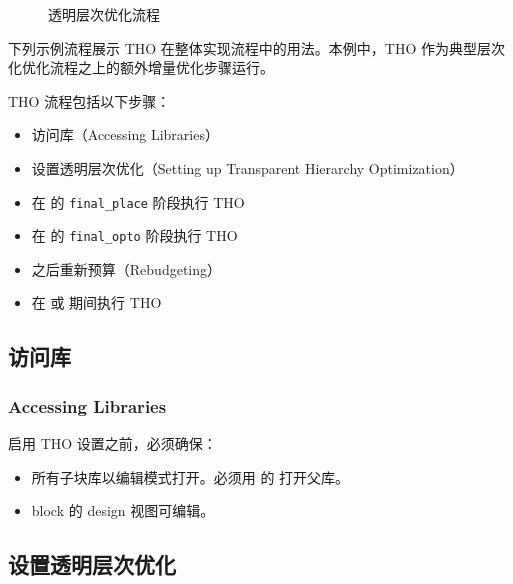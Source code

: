 \begin{figure}[htbp]
\centering
{}
\caption{透明层次优化流程}
\label{fig:hier-tho-flow}
\end{figure}

下列示例流程展示 THO 在整体实现流程中的用法。本例中，THO 作为典型层次化优化流程之上的额外增量优化步骤运行。

THO 流程包括以下步骤：
\begin{itemize}
  \item 访问库（Accessing Libraries）
  \item 设置透明层次优化（Setting up Transparent Hierarchy Optimization）
  \item 在  的 \texttt{final\_place} 阶段执行 THO
  \item 在  的 \texttt{final\_opto} 阶段执行 THO
  \item {} 之后重新预算（Rebudgeting）
  \item 在  或  期间执行 THO
\end{itemize}

\subsection{访问库}
\subsubsection*{Accessing Libraries}

启用 THO 设置之前，必须确保：
\begin{itemize}
  \item 所有子块库以编辑模式打开。必须用  的  打开父库。
  \item block 的 design 视图可编辑。
\end{itemize}

\subsection{设置透明层次优化}
